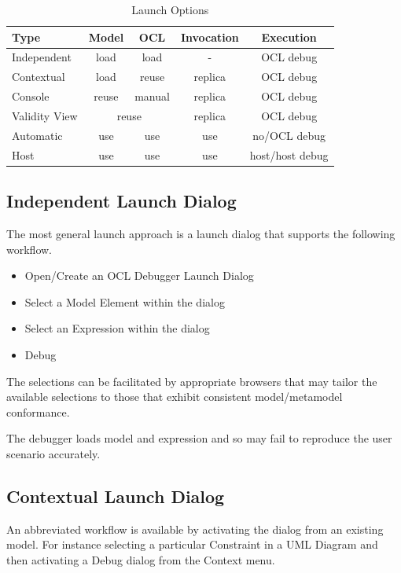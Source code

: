 \documentclass[a4paper]{article}
\begin{document}
\begin{table}[ht]
\begin{center}
\caption{Launch Options}\label{LaunchOptions}
\bigskip
\begin{tabular}{|l|c|c|c|c|}
\hline
Type & Model & OCL & Invocation & Execution\\ \hline \hline
Independent & load & load & - & OCL debug\\ \hline
Contextual & load & reuse & replica & OCL debug\\ \hline
Console & reuse & manual & replica & OCL debug\\ \hline
Validity View & \multicolumn{2}{|c|}{reuse} & replica & OCL debug\\ \hline
Automatic & use & use & use & no/OCL debug\\ \hline
Host & use & use & use & host/host debug\\ \hline
\end{tabular}
\end{center}
\end{table}
 
\subsection{Independent Launch Dialog}

The most general launch approach is a launch dialog that supports the following workflow.

\begin{itemize}
\item Open/Create an OCL Debugger Launch Dialog
\item Select a Model Element within the dialog
\item Select an Expression within the dialog
\item Debug
\end{itemize}

The selections can be facilitated by appropriate browsers that may tailor the available selections to those that exhibit consistent model/metamodel conformance.

The debugger loads model and expression and so may fail to reproduce the user scenario accurately.

\subsection{Contextual Launch Dialog}

An abbreviated workflow is available by activating the dialog from an existing model. For instance selecting a particular Constraint in a UML Diagram and then activating a Debug dialog from the Context menu.
\end{document}
